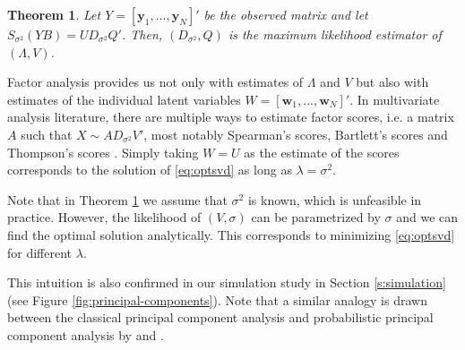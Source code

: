 \documentclass[preprint]{imsart}
\numberwithin{equation}{section}
\theoremstyle{plain}
\newtheorem{theorem}{Theorem}
\newcommand{\tr}[1]{{\textcolor{red}{#1}}}
\newcommand{\by}{\mathbf{y}}
\newcommand{\bw}{\mathbf{w}}
\begin{document}
\begin{theorem}\label{thm:maxlike}
  Let $Y = [\by_1,...,\by_N]'$ be the observed matrix and let $S_{\sigma^2}(YB) = UD_{\sigma^2}Q'$. Then, $(D_{\sigma^2},Q)$ is the maximum likelihood estimator of $(\Lambda,V)$.
\end{theorem}

Factor analysis provides us not only with estimates of $\Lambda$ and $V$ but also with estimates of the individual latent variables $W = [\bw_1,...,\bw_N]'$.
In multivariate analysis literature, there are multiple ways to estimate factor scores, i.e. a matrix $A$ such that $X \sim AD_{\sigma^2}V'$, most notably Spearman's scores, Bartlett's scores and Thompson's scores \citep{kim1978factor}. %
Simply taking $W = U$ as the estimate of the scores corresponds to the solution of \eqref{eq:optsvd} as long as $\lambda = \sigma^2$.

Note that in Theorem \ref{thm:maxlike} we assume that $\sigma^2$ is known, which is unfeasible in practice. However, the likelihood of $(V,\sigma)$ can be parametrized by $\sigma$ and we can find the optimal solution analytically. This corresponds to minimizing \eqref{eq:optsvd} for different $\lambda$.


This intuition is also confirmed in our simulation study in Section \ref{s:simulation} (see Figure \ref{fig:principal-components}). Note that a similar analogy is drawn between the classical principal component analysis and probabilistic principal component analysis by \citet{tipping1999probabilistic} and \citet{james2000principal}. 

\end{document}
